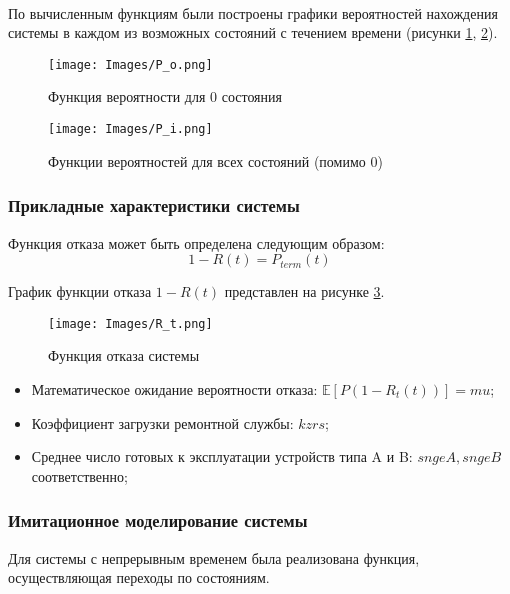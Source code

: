 ~\\

По вычисленным функциям были построены графики вероятностей нахождения системы в каждом из возможных состояний с течением времени
(рисунки \ref{P_o}, \ref{P_i}).
\begin{figure}[H]
\centerline{\texttt{[image: Images/P\_o.png]}}
\caption{Функция вероятности для 0 состояния}
\label{P_o}
\end{figure}

\begin{figure}[H]
\centerline{\texttt{[image: Images/P\_i.png]}}
\caption{Функции вероятностей для всех состояний (помимо 0) }
\label{P_i}
\end{figure}

\subsubsection{Прикладные характеристики системы}

Функция отказа может быть определена следующим образом:
$$1-R(t) = P_{term}(t)$$

График функции отказа $1-R(t)$ представлен на рисунке \ref{R_t}.
\begin{figure}[H]
\centerline{\texttt{[image: Images/R\_t.png]}}
\caption{Функция отказа системы}
\label{R_t}
\end{figure}

\begin{itemize}
    \item Математическое ожидание вероятности отказа:
$\mathbb{E}[P(1-R_t(t))]={{ mu }} $;
\item Коэффициент загрузки ремонтной службы: ${{ kzrs }}$;
\item Среднее число готовых к эксплуатации устройств типа  A и B: ${{ sngeA }}, {{ sngeB }}$ соответственно;
\end{itemize}

\subsubsection{Имитационное моделирование системы}

Для системы с непрерывным временем была реализована функция, осуществляющая переходы по состояниям.

